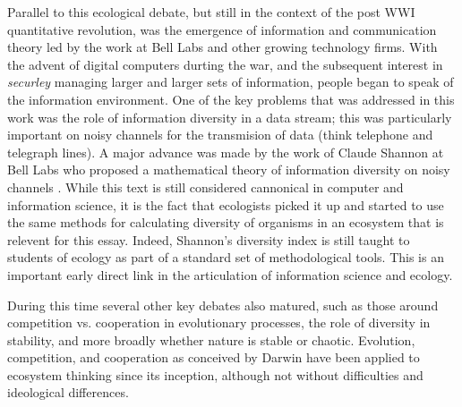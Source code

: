 Parallel to this ecological debate, but still in the context of the post WWI quantitative revolution, was the emergence of information and communication theory led by the work at Bell Labs and other growing technology firms. With the advent of digital computers durting the war, and the subsequent interest in \textit{securley} managing larger and larger sets of information, people began to speak of the information environment. One of the key problems that was addressed in this work was the role of information diversity in a data stream; this was particularly important on noisy channels for the transmision of data (think telephone and telegraph lines). A major advance was made by the work of Claude Shannon at Bell Labs who proposed a mathematical theory of information diversity on noisy channels \cite{shannon_1948}. While this text is still considered cannonical in computer and information science, it is the fact that ecologists picked it up and started to use the same methods for calculating diversity of organisms in an ecosystem that is relevent for this essay. Indeed, Shannon's diversity index is still taught to students of ecology as part of a standard set of methodological tools. This is an important early direct link in the articulation of information science and ecology.

During this time several other key debates also matured, such as those around competition vs. cooperation in evolutionary processes, the role of diversity in stability, and more broadly whether nature is stable or chaotic. Evolution, competition, and cooperation as conceived by Darwin have been applied to ecosystem thinking since its inception, although not without difficulties and ideological differences. 

